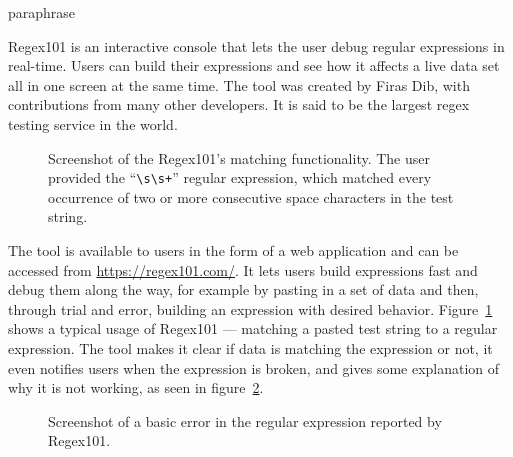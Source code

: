 \documentclass[english,engineering]{wizthesis}
\begin{document}
paraphrase{Regex101 \cite{regex101} is an interactive console that lets the user
debug regular expressions in real-time. Users can build their expressions and
see how it affects a live data set all in one screen at the same time. The tool
was created by Firas Dib, with contributions from many other developers. It is
said to be the largest regex testing service in the world.

\begin{figure}[ht]
  \centering
  \caption{Screenshot of the Regex101's matching functionality. The user
  provided the ``\texttt{\textbackslash{}s\textbackslash{}s+}'' regular
  expression, which matched every occurrence of two or more consecutive space
  characters in the test string.}
  \label{fig:regex101-matching}
\end{figure}

The tool is available to users in the form of a web application and can be
accessed from \url{https://regex101.com/}. It lets users build expressions fast
and debug them along the way, for example by pasting in a set of data and then,
through trial and error, building an expression with desired behavior.
Figure~\ref{fig:regex101-matching} shows a typical usage of Regex101 ---
matching a pasted test string to a regular expression. The tool makes it clear
if data is matching the expression or not, it even notifies users when the
expression is broken, and gives some explanation of why it is not working, as
seen in figure~\ref{fig:regex101-error}.

\begin{figure}[ht]
  \centering
  \caption{Screenshot of a basic error in the regular expression reported by
  Regex101.}
  \label{fig:regex101-error}
\end{figure}

}
\end{document}
